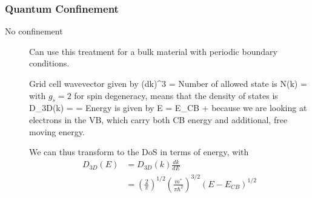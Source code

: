 \subsubsection{Quantum Confinement}
\begin{description}

\item[No confinement] Can use this treatment for a bulk material with periodic boundary conditions. 

Grid cell wavevector given by 
\beq
(dk)^3 = 
\eeq
Number of allowed state is
\beq
N(k) = 
\eeq
with $g_s = 2$ for spin degeneracy, means that the density of states is 
\beq
D_{3D}(k) =  = 
\eeq
Energy is given by 
\beq
E = E_{CB} + 
\eeq
because we are looking at electrons in the VB, which carry both CB energy and additional, free moving energy. 

We can thus transform to the DoS in terms of energy, with
\begin{align}
D_{3D}(E) &= D_{3D} (k) \frac{dk}{dE} \\
&= \left( \frac{2}{\pi} \right)^{1/2} \left( \frac{m^*}{\pi \hbar^2} \right)^{3/2} (E-E_{CB})^{1/2}
\end{align}


\end{description}
